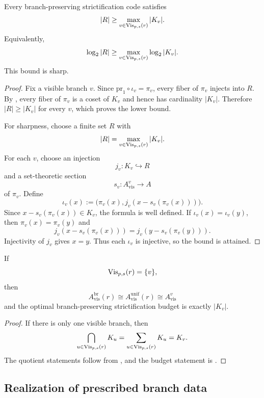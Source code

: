 \begin{proposition}\label{thm:multi-branch-strictification-budget}
Every branch-preserving strictification code satisfies
\[
|R|\ge \max_{v\in \mathrm{Vis}_{p,s}(r)} |K_v|.
\]
Equivalently,
\[
\log_2|R|\ge \max_{v\in \mathrm{Vis}_{p,s}(r)} \log_2|K_v|.
\]
This bound is sharp.
\end{proposition}

\begin{proof}
Fix a visible branch $v$. Since $\mathrm{pr}_1\circ \iota_v=\pi_v$, every fiber of $\pi_v$ injects into $R$. By , every fiber of $\pi_v$ is a coset of $K_v$ and hence has cardinality $|K_v|$. Therefore $|R|\ge |K_v|$ for every $v$, which proves the lower bound.

For sharpness, choose a finite set $R$ with
\[
|R|=\max_{v\in \mathrm{Vis}_{p,s}(r)} |K_v|.
\]
For each $v$, choose an injection
\[
j_v:K_v\hookrightarrow R
\]
and a set-theoretic section
\[
s_v:A_{\mathrm{vis}}^v\to A
\]
of $\pi_v$. Define
\[
\iota_v(x):=\bigl(\pi_v(x),j_v(x-s_v(\pi_v(x)))\bigr).
\]
Since $x-s_v(\pi_v(x))\in K_v$, the formula is well defined. If $\iota_v(x)=\iota_v(y)$, then $\pi_v(x)=\pi_v(y)$ and
\[
j_v(x-s_v(\pi_v(x)))=j_v(y-s_v(\pi_v(y))).
\]
Injectivity of $j_v$ gives $x=y$. Thus each $\iota_v$ is injective, so the bound is attained.
\end{proof}

\begin{corollary}\label{cor:single-branch-reduction}
If
\[
\mathrm{Vis}_{p,s}(r)=\{v\},
\]
then
\[
A_{\mathrm{vis}}^{\mathrm{br}}(r)\cong A_{\mathrm{vis}}^{\mathrm{unif}}(r)\cong A_{\mathrm{vis}}^v
\]
and the optimal branch-preserving strictification budget is exactly $|K_v|$.
\end{corollary}

\begin{proof}
If there is only one visible branch, then
\[
\bigcap_{u\in \mathrm{Vis}_{p,s}(r)} K_u
=
\sum_{u\in \mathrm{Vis}_{p,s}(r)} K_u
=
K_v.
\]
The quotient statements follow from , and the budget statement is .
\end{proof}

\subsection{Realization of prescribed branch data}

